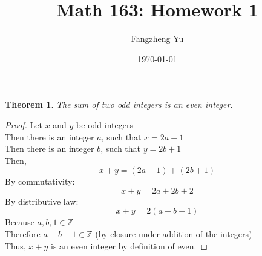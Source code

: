 \documentclass{article}
\title{Math 163: Homework 1}
\author{Fangzheng Yu}
\date{\today}
\newtheorem{theorem}{Theorem}
\begin{document}

	\maketitle
        \begin{theorem}\label{thm:theTheoremIndeed}
                The sum of two odd integers is an even integer.
        \end{theorem}
        \begin{proof}
                Let $x$ and $y$ be odd integers\\
                Then there is an integer \(a\), such that
                $x = 2a + 1$\\
                Then there is an integer \(b\), such that
                $y = 2b + 1$\\
                Then,
                \[x + y = (2a + 1) + (2b + 1)\]
                By commutativity:
                \[x + y = 2a + 2b + 2\]
                By distributive law:
                \[x + y = 2(a + b + 1)\]
                Because
                $a, b, 1 \in \mathbb{Z}$\\
                Therefore
                $a + b + 1 \in \mathbb{Z}$ (by closure under addition of the integers)\\
                Thus, $x + y$ is an even integer by definition of even.
        \end{proof}
\end{document}
